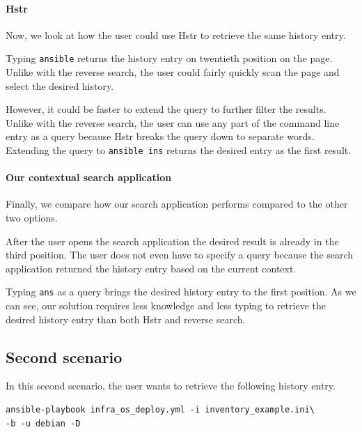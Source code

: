 \paragraph{Hstr}
Now, we look at how the user could use Hstr to retrieve the same history entry.

Typing \verb|ansible| returns the history entry on twentieth position on the page. Unlike with the reverse search, the user could fairly quickly scan the page and select the desired history. 

However, it could be faster to extend the query to further filter the results. Unlike with the reverse search, the user can use any part of the command line entry as a query because Hstr breaks the query down to separate words. Extending the query to \verb|ansible ins| returns the desired entry as the first result.


\paragraph{Our contextual search application}
Finally, we compare how our search application performs compared to the other two options.

After the user opens the search application the desired result is already in the third position. The user does not even have to specify a query because the search application returned the history entry based on the current context.

Typing \verb|ans| as a query brings the desired history entry to the first position. As we can see, our solution requires less knowledge and less typing to retrieve the desired history entry than both Hstr and reverse search. 

\subsection{Second scenario}

In this second scenario, the user wants to retrieve the following history entry.

\begin{verbatim}
ansible-playbook infra_os_deploy.yml -i inventory_example.ini\
-b -u debian -D
\end{verbatim}


